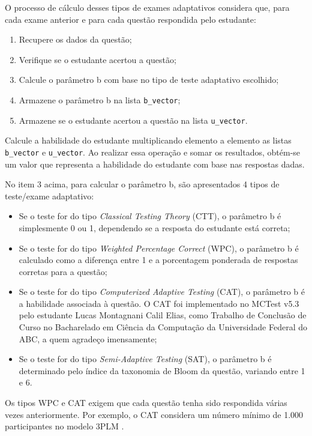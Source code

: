 O processo de cálculo desses tipos de exames adaptativos considera que, para cada exame anterior e para cada questão respondida pelo estudante:

\begin{enumerate}
    \item Recupere os dados da questão;
    \item Verifique se o estudante acertou a questão;
    \item Calcule o parâmetro b com base no tipo de teste adaptativo escolhido;
    \item Armazene o parâmetro b na lista \verb|b_vector|;
    \item Armazene se o estudante acertou a questão na lista \verb|u_vector|.
\end{enumerate}

Calcule a habilidade do estudante multiplicando elemento a elemento as listas \verb|b_vector| e \verb|u_vector|. Ao realizar essa operação e somar os resultados, obtém-se um valor que representa a habilidade do estudante com base nas respostas dadas.

No item 3 acima, para calcular o parâmetro b, são apresentados 4 tipos de teste/exame adaptativo:

\begin{itemize}
    \item Se o teste for do tipo \textit{Classical Testing Theory} (CTT), o parâmetro b é simplesmente 0 ou 1, dependendo se a resposta do estudante está correta;
    \item Se o teste for do tipo \textit{Weighted Percentage Correct} (WPC), o parâmetro b é calculado como a diferença entre 1 e a porcentagem ponderada de respostas corretas para a questão;
    \item Se o teste for do tipo \textit{Computerized Adaptive Testing} (CAT), o parâmetro b é a habilidade associada à questão. O CAT foi implementado no MCTest v5.3 pelo estudante Lucas Montagnani Calil Elias, como Trabalho de Conclusão de Curso no Bacharelado em Ciência da Computação da Universidade Federal do ABC, a quem agradeço imensamente;
    \item Se o teste for do tipo \textit{Semi-Adaptive Testing} (SAT), o parâmetro b é determinado pelo índice da taxonomia de Bloom da questão, variando entre 1 e 6.
\end{itemize}


Os tipos WPC e CAT exigem que cada questão tenha sido respondida várias vezes anteriormente. Por exemplo, o CAT considera um número mínimo de 1.000 participantes no modelo 3PLM \cite{min2021systematic}. 

